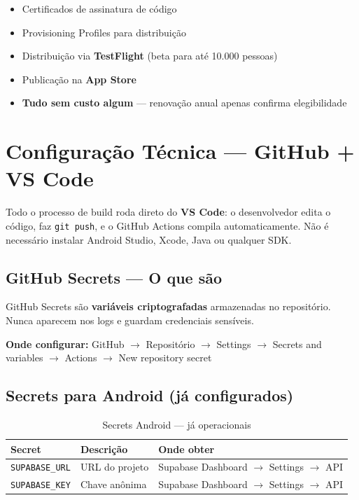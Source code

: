 \documentclass[12pt, a4paper]{article}
\begin{document}
\begin{itemize}
  \item Certificados de assinatura de c\'odigo
  \item Provisioning Profiles para distribui\c{c}\~ao
  \item Distribui\c{c}\~ao via \textbf{TestFlight} (beta para at\'e 10.000 pessoas)
  \item Publica\c{c}\~ao na \textbf{App Store}
  \item \textbf{Tudo sem custo algum} --- renova\c{c}\~ao anual apenas confirma elegibilidade
\end{itemize}


\newpage
\section{Configura\c{c}\~ao T\'ecnica --- GitHub + VS Code}

Todo o processo de build roda direto do \textbf{VS Code}: o desenvolvedor edita o c\'odigo, faz \texttt{git push}, e o GitHub Actions compila automaticamente. N\~ao \'e necess\'ario instalar Android Studio, Xcode, Java ou qualquer SDK.

\subsection{GitHub Secrets --- O que s\~ao}

GitHub Secrets s\~ao \textbf{vari\'aveis criptografadas} armazenadas no reposit\'orio. Nunca aparecem nos logs e guardam credenciais sens\'iveis.

\begin{caixainfo}
  \textbf{Onde configurar:} GitHub $\rightarrow$ Reposit\'orio $\rightarrow$ Settings $\rightarrow$ Secrets and variables $\rightarrow$ Actions $\rightarrow$ New repository secret
\end{caixainfo}

\subsection{Secrets para Android (j\'a configurados)}

\begin{table}[H]
\centering
\renewcommand{\arraystretch}{1.4}
\begin{tabularx}{\textwidth}{|l|X|X|}
\hline
\rowcolor{verdeE}
\textbf{\color{white}Secret} & \textbf{\color{white}Descri\c{c}\~ao} & \textbf{\color{white}Onde obter} \\
\hline
\texttt{SUPABASE\_URL} & URL do projeto & Supabase Dashboard $\rightarrow$ Settings $\rightarrow$ API \\
\hline
\rowcolor{cinzaC}
\texttt{SUPABASE\_KEY} & Chave an\^onima & Supabase Dashboard $\rightarrow$ Settings $\rightarrow$ API \\
\hline
\end{tabularx}
\caption{Secrets Android --- j\'a operacionais}
\end{table}
\end{document}
